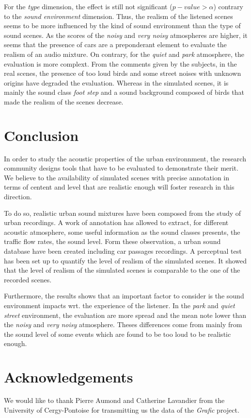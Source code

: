 \documentclass[a4,11pt,twocolumn]{article}
\begin{document}
For the \textit{type} dimension, the effect is still not significant ($p-value > \alpha$) contrary to the \textit{sound environment} dimension. Thus, the realism of the listened scenes seems to be more influenced by the kind of sound environment than the type of sound scenes. As the scores of the \textit{noisy} and \textit{very noisy} atmospheres are higher, it seems that the presence of cars are a preponderant element to evaluate the realism of an audio mixture. On contrary, for the \textit{quiet} and \textit{park} atmosphere, the evaluation is more complext. From the comments given by the subjects, in the real scenes, the presence of too loud birds and some street noises with unknown origins have degraded the evaluation. Whereas in the simulated scenes, it is mainly the sound class \textit{foot step} and a sound background composed of birds that made the realism of the scenes decrease. \\

\section*{Conclusion}

In order to study the acoustic properties of the urban environnment, the research community designs tools that have to be evaluated to demonstrate their merit. We believe to the availability of simulated scenes with precise annotation in terms of centent and level that are realistic enough will foster research in this direction.

To do so, realistic urban sound mixtures have been composed from the study of urban recordings. A work of annotation has allowed to extract, for different acoustic atmosphere, some useful information as the sound classes presents, the traffic flow rates, the sound level. Form these observation, a urban sound database have been created including car passages recordings. A perceptual test has been set up to quantify the level of realism of the simulated scenes. It showed that the level of realism of the simulated scenes is comparable to the one of the recorded scenes.

Furthermore, the results shows that an important factor to consider is the sound environment impacts wrt. the experience of the listener. In the \textit{park} and \textit{quiet street} environment, the evaluation are more spread and the mean note lower than the \textit{noisy} and \textit{very noisy} atmosphere. Theses differences come from mainly from the sound level of some events which are found to be too loud to be realistic enough.%

\section*{Acknowledgements}
We would like to thank Pierre Aumond and Catherine Lavandier from the University of Cergy-Pontoise for transmitting us the data of the \textit{Grafic} project.



\end{document}

